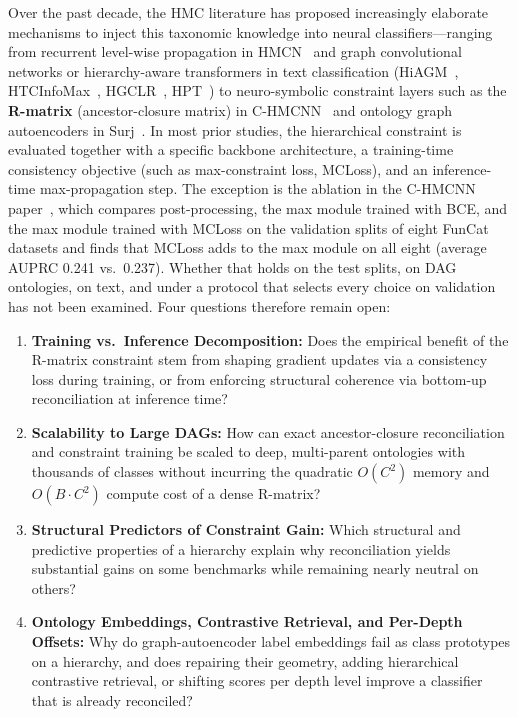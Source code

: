 \documentclass[preprint,12pt]{elsarticle}
\begin{document}
Over the past decade, the HMC literature has proposed increasingly elaborate
mechanisms to inject this taxonomic knowledge into neural classifiers---ranging
from recurrent level-wise propagation in HMCN~\cite{weihs2018hmc} and graph
convolutional networks or hierarchy-aware transformers in text classification
(HiAGM~\cite{zhou2020hiagm}, HTCInfoMax~\cite{htcinfomax},
HGCLR~\cite{hgclr}, HPT~\cite{hpt}) to neuro-symbolic constraint layers such
as the \textbf{R-matrix} (ancestor-closure matrix) in C-HMCNN~\cite{chmcnn}
and ontology graph autoencoders in Surj~\cite{www2022ontology}. In most prior
studies, the hierarchical constraint is evaluated together with a specific
backbone architecture, a training-time consistency objective (such as
max-constraint loss, MCLoss), and an inference-time max-propagation step. The
exception is the ablation in the C-HMCNN paper~\cite{chmcnn}, which compares
post-processing, the max module trained with BCE, and the max module trained
with MCLoss on the validation splits of eight FunCat datasets and finds that
MCLoss adds to the max module on all eight (average AUPRC 0.241 vs.\ 0.237).
Whether that holds on the test splits, on DAG ontologies, on text, and under a
protocol that selects every choice on validation has not been examined.
Four questions therefore remain open:
\begin{enumerate}[leftmargin=*,nosep,label=\textbf{Q\arabic*.}]
  \item \textbf{Training vs.\ Inference Decomposition:} Does the empirical
    benefit of the R-matrix constraint stem from shaping gradient updates via
    a consistency loss during training, or from enforcing structural coherence
    via bottom-up reconciliation at inference time?
  \item \textbf{Scalability to Large DAGs:} How can exact ancestor-closure
    reconciliation and constraint training be scaled to deep, multi-parent
    ontologies with thousands of classes without incurring the quadratic
    $O(C^2)$ memory and $O(B \cdot C^2)$ compute cost of a dense R-matrix?
  \item \textbf{Structural Predictors of Constraint Gain:} Which structural
    and predictive properties of a hierarchy explain why reconciliation yields
    substantial gains on some benchmarks while remaining nearly neutral on
    others?
  \item \textbf{Ontology Embeddings, Contrastive Retrieval, and Per-Depth
    Offsets:} Why do graph-autoencoder label embeddings fail as class
    prototypes on a hierarchy, and does repairing their geometry, adding
    hierarchical contrastive retrieval, or shifting scores per depth level
    improve a classifier that is already reconciled?
\end{enumerate}
\end{document}
